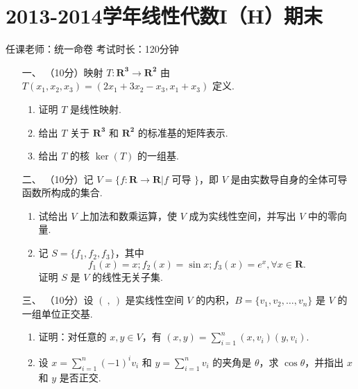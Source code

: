 \section*{2013-2014学年线性代数I（H）期末}

\begin{center}
    任课老师：统一命卷\hspace{4em} 考试时长：120分钟
\end{center}

\begin{enumerate}
    \item [一、]（10分）映射 $T:\mathbf{R^3} \to \mathbf{R^2}$ 由 $T(x_1,x_2,x_3)=(2x_1+3x_2-x_3,x_1+x_3)$ 定义.
    \begin{enumerate}[label=(\arabic*)]
        \item 证明 $T$ 是线性映射.

        \item 给出 $T$ 关于 $\mathbf{R^3}$ 和 $\mathbf{R^2}$ 的标准基的矩阵表示.

        \item 给出 $T$ 的核 $\ker(T)$ 的一组基.
    \end{enumerate}

\item [二、]（10分）记 $V=\{f:\mathbf{R}\to \mathbf{R}|f$ 可导 $\}$，即 $V$ 是由实数导自身的全体可导函数所构成的集合.
    \begin{enumerate}[label=(\arabic*)]
        \item 试给出 $V$ 上加法和数乘运算，使 $V$ 成为实线性空间，并写出 $V$ 中的零向量.

        \item 记 $S=\{f_1,f_2,f_3\}$，其中
        \[f_1(x)=x;f_2(x)=\sin x;f_3(x)=e^x,\forall x \in \mathbf{R}.\]
        证明 $S$ 是 $V$ 的线性无关子集.
    \end{enumerate}

\item [三、]（10分）设 $(\ ,\ )$ 是实线性空间 $V$ 的内积，$B=\{v_1,v_2,\ldots,v_n\}$ 是 $V$ 的一组单位正交基.
    \begin{enumerate}[label=(\arabic*)]
        \item 证明：对任意的 $x,y \in V$，有 $(x,y) = \sum\limits_{i=1}^n(x,v_i)(y,v_i)$.

        \item 设 $x=\sum\limits_{i=1}^n(-1)^iv_i$ 和 $y=\sum\limits_{i=1}^nv_i$ 的夹角是 $\theta$，求 $\cos \theta$，并指出 $x$ 和 $y$ 是否正交.
    \end{enumerate}


\end{enumerate}
